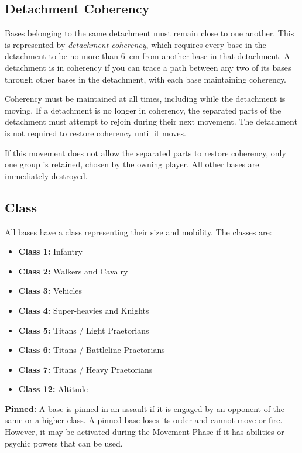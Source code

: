 \subsection{Detachment Coherency}

Bases belonging to the same detachment must remain close to one another. This is represented by \textit{detachment coherency}, which requires every base in the detachment to be no more than 6~cm from another base in that detachment. A detachment is in coherency if you can trace a path between any two of its bases through other bases in the detachment, with each base maintaining coherency.

Coherency must be maintained at all times, including while the detachment is moving. If a detachment is no longer in coherency, the separated parts of the detachment must attempt to rejoin during their next movement. The detachment is not required to restore coherency until it moves.

If this movement does not allow the separated parts to restore coherency, only one group is retained, chosen by the owning player. All other bases are immediately destroyed.

\subsection{Class}

All bases have a class representing their size and mobility. The classes are:

\begin{itemize}
    \item \textbf{Class 1:} Infantry
    \item \textbf{Class 2:} Walkers and Cavalry
    \item \textbf{Class 3:} Vehicles
    \item \textbf{Class 4:} Super-heavies and Knights
    \item \textbf{Class 5:} Titans / Light Praetorians
    \item \textbf{Class 6:} Titans / Battleline Praetorians
    \item \textbf{Class 7:} Titans / Heavy Praetorians
    \item \textbf{Class 12:} Altitude
\end{itemize}

\noindent\textbf{Pinned:} A base is pinned in an assault if it is engaged by an opponent of the same or a higher class. A pinned base loses its order and cannot move or fire. However, it may be activated during the Movement Phase if it has abilities or psychic powers that can be used.

